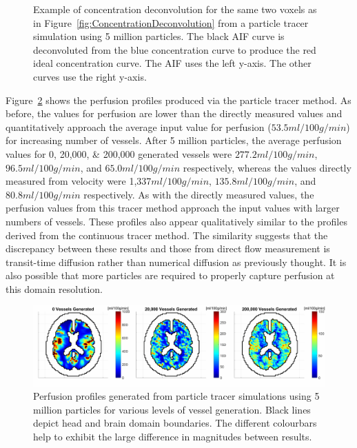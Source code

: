 \documentclass[11pt,english,a4paper,twoside,openright]{report}
\begin{document}
{{{{{{{\begin{figure}[h]
	\caption[Example of concentration deconvolution from a particle tracer simulation using 5 million particles]{Example of concentration deconvolution for the same two voxels as in Figure~\ref{fig:ConcentrationDeconvolution} from a particle tracer simulation using 5 million particles. The black AIF curve is deconvoluted from the blue concentration curve to produce the red ideal concentration curve. The AIF uses the left y-axis. The other curves use the right y-axis.}
	\label{fig:MonteCarloExampleProfile}
\end{figure}

Figure~\ref{fig:MonteCarloResults1} shows the perfusion profiles produced via the particle tracer method. As before, the values for perfusion are lower than the directly measured values and quantitatively approach the average input value for perfusion ($53.5ml/100g/min$) for increasing number of vessels. After 5 million particles, the average perfusion values for 0, 20,000, \& 200,000 generated vessels were $277.2ml/100g/min$, $96.5ml/100g/min$, and $65.0ml/100g/min$ respectively, whereas the values directly measured from velocity were 1,337$ml/100g/min$, $135.8ml/100g/min$, and $80.8ml/100g/min$ respectively. As with the directly measured values, the perfusion values from this tracer method approach the input values with larger numbers of vessels. These profiles also appear qualitatively similar to the profiles derived from the continuous tracer method. The similarity suggests that the discrepancy between these results and those from direct flow measurement is transit-time diffusion rather than numerical diffusion as previously thought. It is also possible that more particles are required to properly capture perfusion at this domain resolution. 

\begin{figure}[h]
	\centering
	\includegraphics[width=\textwidth]{Chapter4/MonteCarloPerfusions}
	\caption[Perfusion profiles generated from particle tracer simulations using 5 million particles for various levels of vessel generation]{Perfusion profiles generated from particle tracer simulations using 5 million particles for various levels of vessel generation. Black lines depict head and brain domain boundaries. The different colourbars help to exhibit the large difference in magnitudes between results.}
	\label{fig:MonteCarloResults1}
\end{figure}

}}}}}}}
\end{document}
